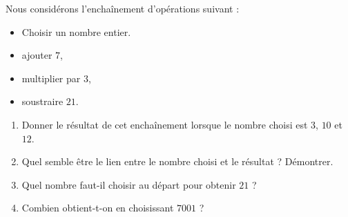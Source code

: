 
\begin{exercice}\label{exosmath-0827}

Nous considérons l'enchaînement d'opérations suivant :
\begin{itemize}
    \item Choisir un nombre entier.
    \item ajouter \( 7\),
    \item multiplier par \( 3\),
    \item soustraire \( 21\).
\end{itemize}
\begin{enumerate}
    \item
        Donner le résultat de cet enchaînement lorsque le nombre choisi est \( 3\), \( 10\) et \( 12\).
    \item
        Quel semble être le lien entre le nombre choisi et le résultat ? Démontrer.
    \item
        Quel nombre faut-il choisir au départ pour obtenir \( 21\) ?
    \item
        Combien obtient-t-on en choisissant \( 7001\) ?
\end{enumerate}

\end{exercice}
